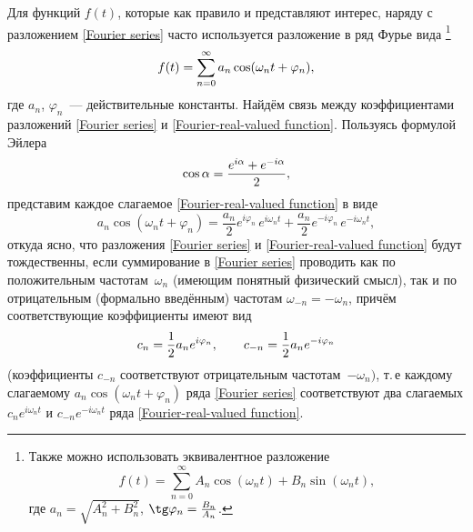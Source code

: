 Для  функций $f(t)$, которые как правило и представляют интерес,
наряду с разложением \eqref{Fourier series} часто используется разложение
в ряд Фурье вида%
\footnote{Также можно использовать эквивалентное разложение
\begin{equation*}f(t)=\sum\limits_{n=0}^{\infty} A_n \cos(\omega_n t) + B_n \sin(\omega_n t),\end{equation*}
где $a_n=\sqrt{A_n^2+B_n^2}$, $\tg \varphi_n = \frac{B_n}{A_n}$.}
\begin{equation}
    \eqmark{Fourier-real-valued function}
    f(t)=\sum\limits_{n=0}^{\infty} a_n \cos(\omega_n t+\varphi_n ),
\end{equation}
где $a_n$, $\varphi_n$~--- действительные константы. Найдём связь между
коэффициентами разложений \eqref{Fourier series} и \eqref{Fourier-real-valued function}.
Пользуясь формулой Эйлера
\begin{equation}
    \eqmark{euler}
    \cos\alpha=\frac{e^{i\alpha}+e^{-i\alpha}}{2},
\end{equation}
представим каждое слагаемое \eqref{Fourier-real-valued function} в виде
\begin{equation*}
    a_n\cos(\omega_nt+\varphi_n)=\frac{a_n}{2}e^{i\varphi_n}\,e^{i\omega_n
t}+\frac{a_n}{2}e^{-i\varphi_n}\,e^{-i\omega_n t},
\end{equation*}
откуда ясно, что разложения \eqref{Fourier series} и
\eqref{Fourier-real-valued function} будут тождественны, если суммирование в
\eqref{Fourier series} проводить как по положительным частотам~$\omega_n$
(имеющим понятный физический смысл), так и по отрицательным (формально введённым)
частотам $\omega_{-n}=-\omega_n$, причём соответствующие коэффициенты имеют вид
\begin{equation}
    \eqmark{Fourier-coefficient}
    c_n =\frac{1}{2}a_n e^{i\varphi_n},
    \qquad c_{-n}=\frac{1}{2}a_n e^{-i\varphi_n}
\end{equation}
(коэффициенты $c_{-n}$ соответствуют отрицательным частотам~$-\omega_n)$,
т.\,е каждому слагаемому $a_n\cos(\omega_nt+\varphi_n)$ ряда \eqref{Fourier series}
соответствуют два слагаемых $c_ne^{i\omega_n t}$ и
$c_{-n}e^{-i\omega_n t}$ ряда \eqref{Fourier-real-valued function}.


